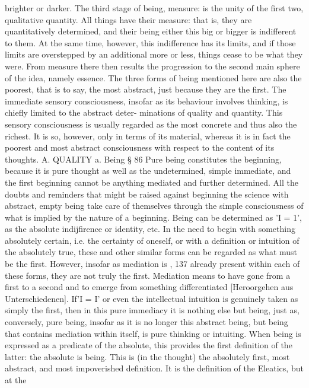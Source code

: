 brighter or darker. The third stage of being, measure: is the unity of the first two,
qualitative quantity. All things have their measure: that is, they are quantitatively
determined, and their being either this big or bigger is indifferent to them. At
the same time, however, this indifference has its limits, and if those limits are
overstepped by an additional more or less, things cease to be what they were. From
measure there then results the progression to the second main sphere of the idea,
namely essence.
The three forms of being mentioned here are also the poorest, that is to say, the
most abstract, just because they are the first. The immediate sensory consciousness,
insofar as its behaviour involves thinking, is chiefly limited to the abstract deter-
minations of quality and quantity. This sensory consciousness is usually regarded
as the most concrete and thus also the richest. It is so, however, only in terms of
its material, whereas it is in fact the poorest and most abstract consciousness with
respect to the content of its thoughts.
A. QUALITY
a. Being
§ 86
Pure being constitutes the beginning, because it is pure thought as well as
the undetermined, simple immediate, and the first beginning cannot be
anything mediated and further determined.
All the doubts and reminders that might be raised against beginning
the science with abstract, empty being take care of themselves
through the simple consciousness of what is implied by the nature
of a beginning. Being can be determined as 'I = 1', as the absolute
indijfirence or identity, etc. In the need to begin with something
absolutely certain, i.e. the certainty of oneself, or with a definition or
intuition of the absolutely true, these and other similar forms can be
regarded as what must be the first. However, insofar as mediation is
,
137
already present within each of these forms, they are not truly the
first. Mediation means to have gone from a first to a second
and to emerge from something differentiated [Heroorgehen aus
Unterschiedenen]. If'I = I' or even the intellectual intuition is
genuinely taken as simply the first, then in this pure immediacy it
is nothing else but being, just as, conversely, pure being, insofar as it
is no longer this abstract being, but being that contains mediation
within itself, is pure thinking or intuiting.
When being is expressed as a predicate of the absolute, this
provides the first definition of the latter: the absolute is being. This
is (in the thought) the absolutely first, most abstract, and most
impoverished definition. It is the definition of the Eleatics, but at the
